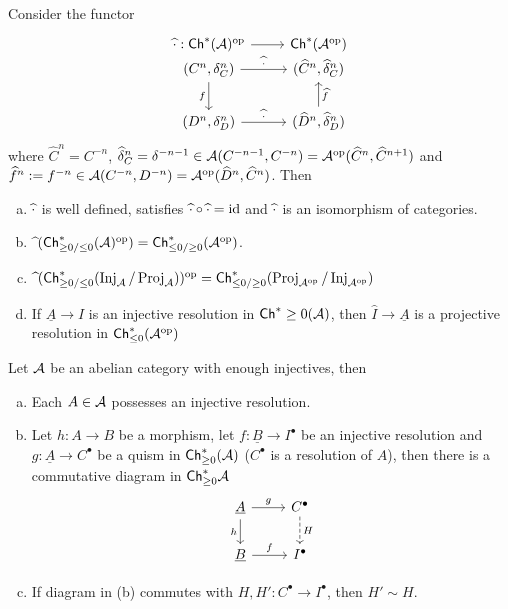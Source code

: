 \documentclass[a4paper]{report}
\begin{document}
\begin{prop}Consider the functor
  \[\begin{tikzcd}
\hat \cd: \coch(\A)\op \arrow[r]          & \coch (\A\op)                                  \\[-20]
{(C^n, \d_C^n)} \arrow[r, "\hat \cd"] \arrow[d, "f"'] & {(\hat C^n, \hat \d_C^n)}                      \\
{(D^n, \d_D^n)} \arrow[r, "\hat \cd"]                 & {(\hat D^n, \hat \d_D^n)} \arrow[u, "\hat f"']
\end{tikzcd}\]
where $\hat C^{n} = C^{-n}$, $\widehat {\delta}^{n}_{C} = \delta^{-n-1} \in \mathcal{A}(C^{-n-1}, C^{-n}) = \mathcal{A}^\mathrm{op}(\widehat C^{n}, \widehat C^{n+1})$ and $\widehat f^{n}:= f^{-n} \in \mathcal{A}(C^{-n}, D^{-n}) = \mathcal{A}^\mathrm{op}(\widehat D^{n}, \widehat C^{n})$.
Then
\begin{enumerate}[(a)]
  \item $\widehat {\cdot}$ is well defined, satisfies $\widehat {\cdot} \circ \widehat {\cdot} = \operatorname{id}$ and $\widehat {\cdot}$ is an isomorphism of categories.
  \item $\widehat{\ }({\mathsf{Ch}^*_{\ge 0/\le 0}(\mathcal{A})^\mathrm{op}}) = \mathsf{Ch}^*_{\le 0/\ge 0}(\mathcal{A}^\mathrm{op})$.
  \item $\widehat{\ }(\mathsf{Ch}^*_{\ge 0/\le 0}(\operatorname{Inj}_{\mathcal{A}}/\operatorname{Proj}_{\mathcal{A}}))^\mathrm{op} = \mathsf{Ch}^*_{\le 0/\ge 0}(\operatorname{Proj}_{\mathcal{A}^\mathrm{op}}/\operatorname{Inj}_{\mathcal{A}^\mathrm{op}})$
        \item If $\underline A \to I$ is an injective resolution in $\mathsf{Ch}^* \ge 0 (\mathcal{A})$, then $\hat I \to \underline A$ is a projective resolution in $\mathsf{Ch}^*_{\le 0}(\mathcal{A}^\mathrm{op})$
\end{enumerate}
\end{prop}

\begin{thm}
  Let $\mathcal{A}$ be an abelian category with enough injectives, then
  \begin{enumerate}[(a)]
    \item Each $A \in \mathcal{A}$ possesses an injective resolution.
    \item Let $h: A \to B$ be a morphism, let $f: \underline B \to I^{\bullet}$ be an injective resolution and $g: \underline A \to C^{\bullet}$ be a quism in $\mathsf{Ch}^*_{\ge 0}(\mathcal{A})$ ($C^{\bullet}$ is a resolution of $A$), then there is a commutative diagram in $\mathsf{Ch}^*_{\ge 0} \mathcal{A}$
          \[\begin{tikzcd}
\underline A \arrow[r, "g"] \arrow[d, "h"'] & C^\bullet \arrow[d, "H", dashed] \\
\underline B \arrow[r, "f"]                 & I^\bullet
\end{tikzcd}\]
          \item If diagram in (b) commutes with $H, H': C^{\bullet} \to I^{\bullet}$, then $H' \sim H$.
  \end{enumerate}
\end{thm}
\end{document}
